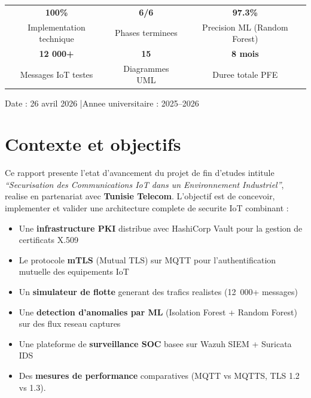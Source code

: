 \documentclass[a4paper,11pt]{article}
\begin{document}
\begin{titlepage}
  \vspace{1cm}

  \begin{tcolorbox}[colback=primary!10, colframe=primary,
                    title={\faChartBar\quad Synthese -- 26 avril 2026},
                    fonttitle=\bfseries, coltitle=white, arc=4pt]
    \centering
    \begin{tabular}{ccc}
      \textbf{\Large 100\%} & \textbf{\Large 6/6} & \textbf{\Large 97.3\%} \\
      Implementation technique & Phases terminees & Precision ML (Random Forest) \\[0.3cm]
      \textbf{\Large 12 000+} & \textbf{\Large 15} & \textbf{\Large 8 mois} \\
      Messages IoT testes & Diagrammes UML & Duree totale PFE \\
    \end{tabular}
  \end{tcolorbox}

  \vfill
  {\color{gray}\small Date : 26 avril 2026 \quad|\quad Annee universitaire : 2025--2026}
\end{titlepage}

\newpage
\tableofcontents
\newpage

\section{Contexte et objectifs}

Ce rapport presente l'etat d'avancement du projet de fin d'etudes intitule
\textit{``Securisation des Communications IoT dans un Environnement Industriel''},
realise en partenariat avec \textbf{Tunisie Telecom}. L'objectif est de concevoir,
implementer et valider une architecture complete de securite IoT combinant :

\begin{itemize}[leftmargin=1.5em]
  \item Une \textbf{infrastructure PKI} distribue avec HashiCorp Vault pour la gestion de certificats X.509 
  \item Le protocole \textbf{mTLS} (Mutual TLS) sur MQTT pour l'authentification mutuelle des equipements IoT 
  \item Un \textbf{simulateur de flotte} generant des trafics realistes (12~000+ messages) 
  \item Une \textbf{detection d'anomalies par ML} (Isolation Forest + Random Forest) sur des flux reseau captures 
  \item Une plateforme de \textbf{surveillance SOC} basee sur Wazuh SIEM + Suricata IDS 
  \item Des \textbf{mesures de performance} comparatives (MQTT vs MQTTS, TLS 1.2 vs 1.3).
\end{itemize}
\end{document}
